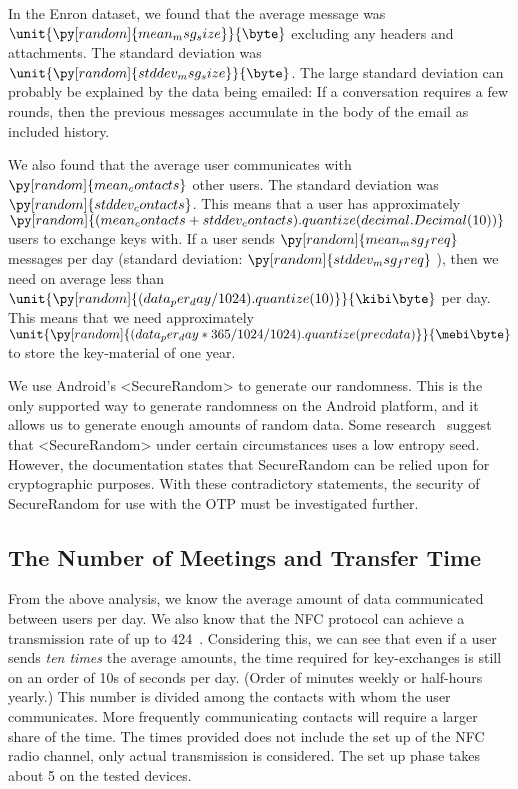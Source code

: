 In the Enron dataset, we found that the average message was
\(\unit{\py[random]{mean_msg_size}}{\byte}\)
excluding any headers and attachments.
The standard deviation was
\(\unit{\py[random]{stddev_msg_size}}{\byte}\).
The large standard deviation can probably be explained by the data being 
emailed:
If a conversation requires a few rounds, then the previous messages accumulate 
in the body of the email as included history.

We also found that the average user communicates with
\(\py[random]{mean_contacts}\)
other users.
The standard deviation was
\(\py[random]{stddev_contacts}\).
This means that a user has approximately
\(\py[random]{(mean_contacts 
+ stddev_contacts).quantize(decimal.Decimal(10))}\)
users to exchange keys with.
If a user sends
\(\py[random]{mean_msg_freq}\)
messages per day (standard deviation:
\(\py[random]{stddev_msg_freq}\)%
), then we need on average less than
\(\unit{\py[random]{(data_per_day/1024).quantize( 10 )}}{\kibi\byte}\)
per day.
This means that we need approximately
\(\unit{\py[random]{(data_per_day*365/1024/1024).quantize( precdata 
      )}}{\mebi\byte}\) to store the key-material of one year.


We use Android's <SecureRandom> to generate our randomness.
This is the only supported way to generate randomness on the Android platform, 
and it allows us to generate enough amounts of random data.
Some research~\cite{AndroidLowEntropyMyth,JavaRandomness} suggest that 
<SecureRandom> under certain circumstances uses a low entropy seed.
However, the documentation states that SecureRandom can be relied upon for 
cryptographic purposes.
With these contradictory statements, the security of SecureRandom for use with 
the \ac{OTP} must be investigated further.

\subsection{The Number of Meetings and Transfer Time}
\label{NumberOfMeetings}
From the above analysis, we know the average amount of data communicated 
between users per day.
We also know that the \ac{NFC} protocol can achieve a transmission rate of up 
to \unit{424}{\kilo\bit\per\second}~\cite{NFCController}.
Considering this, we can see that even if a user sends \emph{ten times} the 
average amounts, the time required for key-exchanges is still on an order of 
10s of seconds per day.
(Order of minutes weekly or half-hours yearly.)
This number is divided among the contacts with whom the user communicates.
More frequently communicating contacts will require a larger share of the time.
The times provided does not include the set up of the \ac{NFC} radio channel, 
only actual transmission is considered.
The set up phase takes about \unit{5}{\second} on the tested devices.

